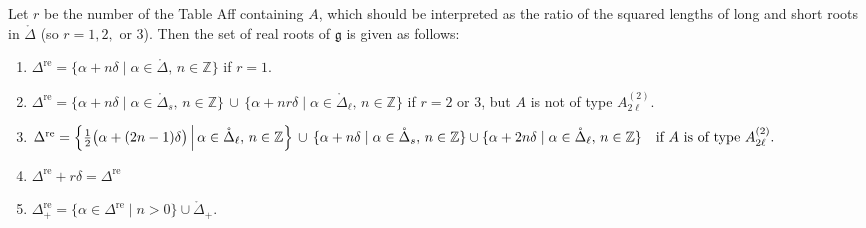 \documentclass[12pt]{article}
\begin{document}
\begin{proposition}
\label{prop:real-roots-affine}
Let $r$ be the number of the Table Aff containing $A$, which should be interpreted as the ratio of the squared lengths of long and short roots in $\mathring{\Delta}$ (so $r=1,2,$ or $3$). Then the set of real roots of $\mathfrak{g}$ is given as follows:
\begin{enumerate}[label=\alph*)]
\item $\Delta^{\mathrm{re}} = \{\alpha+n\delta \mid \alpha\in \mathring{\Delta},\, n\in \mathbb{Z}\}$ \quad if $r=1$.
\item $\Delta^{\mathrm{re}} = \{\alpha+n\delta \mid \alpha\in \mathring{\Delta}_s,\, n\in \mathbb{Z}\} \,\cup\, \{\alpha+nr\delta \mid \alpha\in \mathring{\Delta}_\ell,\, n\in \mathbb{Z}\}$
if $r=2$ or $3$, but $A$ is not of type $A_{2\ell}^{(2)}$.
\item $\Delta^{\mathrm{re}} = \left\{ \tfrac{1}{2}\big(\alpha+(2n-1)\delta\big) \,\middle|\, \alpha\in \mathring{\Delta}_\ell,\, n\in \mathbb{Z} \right\} 
\,\cup\, \{\alpha+n\delta \mid \alpha\in \mathring{\Delta}_s,\, n\in \mathbb{Z}\} \\
\cup \{\alpha+2n\delta \mid \alpha\in \mathring{\Delta}_\ell,\, n\in \mathbb{Z}\}
\quad \text{if $A$ is of type $A_{2\ell}^{(2)}$.}$
\item $\Delta^{\mathrm{re}}+r\delta=\Delta^{\mathrm{re}}$
\item $\Delta^{\mathrm{re}}_+ = \{\alpha \in \Delta^{\mathrm{re}} \mid n>0\}\cup \mathring{\Delta}_+.$
\end{enumerate}
\end{proposition}
\end{document}
